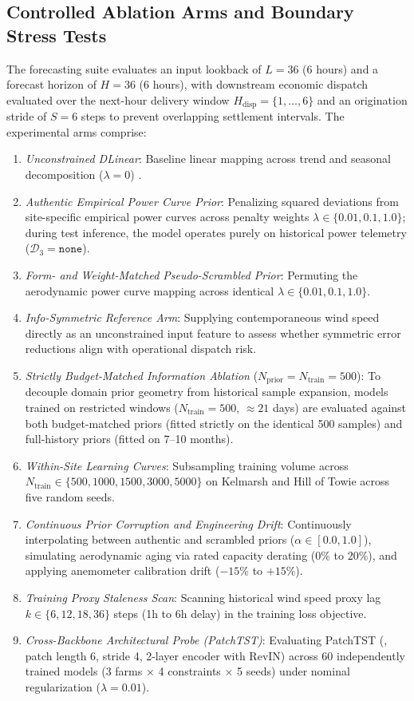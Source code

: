 \subsection{Controlled Ablation Arms and Boundary Stress Tests}
The forecasting suite evaluates an input lookback of $L=36$ (6 hours) and a forecast horizon of $H=36$ (6 hours), with downstream economic dispatch evaluated over the next-hour delivery window $H_{\text{disp}} = \{1, \dots, 6\}$ and an origination stride of $S=6$ steps to prevent overlapping settlement intervals. The experimental arms comprise:
\begin{enumerate}[leftmargin=*]
\item \textit{Unconstrained DLinear}: Baseline linear mapping across trend and seasonal decomposition ($\lambda=0$) \cite{zeng2023dlinear}.
\item \textit{Authentic Empirical Power Curve Prior}: Penalizing squared deviations from site-specific empirical power curves across penalty weights $\lambda \in \{0.01, 0.1, 1.0\}$; during test inference, the model operates purely on historical power telemetry ($\mathcal{D}_3 = \texttt{none}$).
\item \textit{Form- and Weight-Matched Pseudo-Scrambled Prior}: Permuting the aerodynamic power curve mapping across identical $\lambda \in \{0.01, 0.1, 1.0\}$.
\item \textit{Info-Symmetric Reference Arm}: Supplying contemporaneous wind speed directly as an unconstrained input feature to assess whether symmetric error reductions align with operational dispatch risk.
\item \textit{Strictly Budget-Matched Information Ablation} ($N_{\text{prior}}=N_{\text{train}}=500$): To decouple domain prior geometry from historical sample expansion, models trained on restricted windows ($N_{\text{train}}=500$, $\approx 21$ days) are evaluated against both budget-matched priors (fitted strictly on the identical 500 samples) and full-history priors (fitted on 7--10 months).
\item \textit{Within-Site Learning Curves}: Subsampling training volume across $N_{\text{train}} \in \{500, 1000, 1500, 3000, 5000\}$ on Kelmarsh and Hill of Towie across five random seeds.
\item \textit{Continuous Prior Corruption and Engineering Drift}: Continuously interpolating between authentic and scrambled priors ($\alpha \in [0.0, 1.0]$), simulating aerodynamic aging via rated capacity derating (0\% to 20\%), and applying anemometer calibration drift ($-15\%$ to $+15\%$).
\item \textit{Training Proxy Staleness Scan}: Scanning historical wind speed proxy lag $k \in \{6, 12, 18, 36\}$ steps (1h to 6h delay) in the training loss objective.
\item \textit{Cross-Backbone Architectural Probe (PatchTST)}: Evaluating PatchTST (\cite{nie2023patchtst}, patch length 6, stride 4, 2-layer encoder with RevIN) across 60 independently trained models (3 farms $\times$ 4 constraints $\times$ 5 seeds) under nominal regularization ($\lambda=0.01$).
\end{enumerate}

